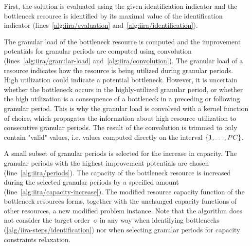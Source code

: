 \begin{steps}
    \item
    First, the solution is evaluated using the given identification indicator
    and the bottleneck resource is identified by its maximal value of the identification indicator
    (lines~\ref{alg:iira/evaluation} and~\ref{alg:iira/identification}).

    \item
    The granular load of the bottleneck resource is computed
    and the improvement potentials for granular periods are computed
    using convolution (lines~\ref{alg:iira/granular-load} and~\ref{alg:iira/convolution}).
    The granular load of a resource indicates how the resource is being utilized during granular periods.
    High utilization could indicate a potential bottleneck.
    However, it is uncertain whether the bottleneck occurs in the highly-utilized granular period,
    or whether the high utilization is a consequence of a bottleneck
    in a preceding or following granular period.
    This is why the granular load is convolved with a kernel function of choice,
    which propagates the information about high resource utilization
    to consecutive granular periods.
    The result of the convolution is trimmed to only contain "valid" values,
    i.e. values computed directly on the interval $\{{1}, \dots, {PC}\}$.
    \label{alg/iira-steps/identification}

    \item
    A small subset of granular periods is selected for the increase in capacity.
    The granular periods with the highest improvement potentials are chosen (line~\ref{alg:iira/periods}).
    The capacity of the bottleneck resource is increased during the selected granular periods
    by a specified amount (line~\ref{alg:iira/capacity-increase}).
    The modified resource capacity function of the bottleneck resources forms,
    together with the unchanged capacity functions of other resources,
    a new modified problem instance.
    Note that the algorithm does not consider the target order~$o$ in any way
    when identifying bottlenecks (\cref{alg/iira-steps/identification})
    nor when selecting granular periods for capacity constraints relaxation.


\end{steps}
